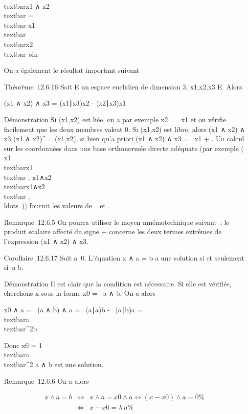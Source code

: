 \\textbar{}x1 ∧
x2\\textbar{} =\\textbar{}
x1\\textbar{}\,\\textbar{}x2\\textbar{}\
sin \theta

On a également le résultat important suivant

Théorème~12.6.16 Soit E un espace euclidien de dimension 3,
x1,x2,x3 \in E. Alors

(x1 ∧ x2) ∧ x3 =
(x1∣x3)x2 -
(x2∣x3)x1

Démonstration Si (x1,x2) est liée, on a par exemple
x2 = \lambda~x1 et on vérifie facilement que les deux
membres valent 0. Si (x1,x2) est libre, alors
(x1 ∧ x2) ∧ x3 \in (x1 ∧
x2)^\bot =\
\mathrmVect(x1,x2), si bien
qu'a priori (x1 ∧ x2) ∧ x3 = \lambda~x1
+ \mux2. Un calcul sur les coordonnées dans une base orthonormée
directe adéquate (par exemple ( x1 \over
\\textbar{}x1\\textbar{} ,
x1∧x2 \over
\\textbar{}x1∧x2\\textbar{}
,\\ldots~)) fournit
les valeurs de \lambda~ et \mu.

Remarque~12.6.5 On pourra utiliser le moyen mnémotechnique suivant~: le
produit scalaire affecté du signe + concerne les deux termes extrêmes de
l'expression (x1 ∧ x2) ∧ x3.

Corollaire~12.6.17 Soit a\neq~0. L'équation x ∧ a
= b a une solution si et seulement si~a \bot b.

Démonstration Il est clair que la condition est nécessaire. Si elle est
vérifiée, cherchons x sous la forme x0 = \lambda~a ∧ b. On a alors

x0 ∧ a = \lambda~(a ∧ b) ∧ a = \lambda~(a∣a)b -
\lambda~(a∣b)a =
\lambda~\\textbar{}a\\textbar{}^2b

Donc x0 = 1 \over
\\textbar{}a\\textbar{}^2 a ∧
b est une solution.

Remarque~12.6.6 On a alors

\begin{align*} x ∧ a = b&
\Leftrightarrow & x ∧ a = x0 ∧ a
\Leftrightarrow (x - x0) ∧ a = 0\%&
\\ & \Leftrightarrow & x -
x0 = \lambda~a \%& \\
\end{align*}

